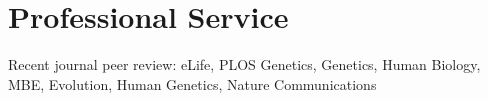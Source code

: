 \documentclass[letterpaper]{article}
\renewenvironment{itemize}{
  \begin{list}{}{
    \setlength{\leftmargin}{1.5em}
  }
}{
  \end{list}
}
\begin{document}

\section*{Professional Service}
\begin{itemize}

\item Recent journal peer review: eLife, PLOS Genetics, Genetics, Human Biology, MBE, Evolution, Human Genetics, Nature Communications

\end{itemize}
\end{document}
